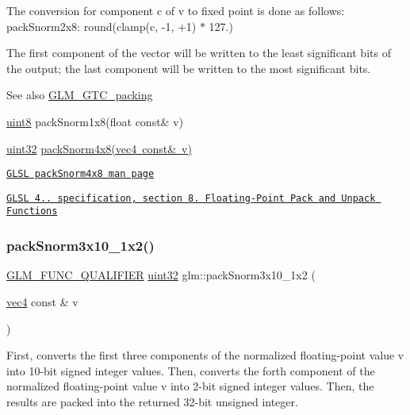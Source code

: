 The conversion for component c of v to fixed point is done as follows\+: pack\+Snorm2x8\+: round(clamp(c, -\/1, +1) $\ast$ 127.)

The first component of the vector will be written to the least significant bits of the output; the last component will be written to the most significant bits.

\begin{DoxySeeAlso}{See also}
\mbox{\hyperlink{group__gtc__packing}{G\+L\+M\+\_\+\+G\+T\+C\+\_\+packing}} 

\mbox{\hyperlink{group__gtc__type__precision_ga1a7dcd8aac97cc8020817c94049deff2}{uint8}} pack\+Snorm1x8(float const\& v) 

\mbox{\hyperlink{group__gtc__type__precision_ga202b6a53c105fcb7e531f9b443518451}{uint32}} \mbox{\hyperlink{group__core__func__packing_ga85e8f17627516445026ab7a9c2e3531a}{pack\+Snorm4x8(vec4 const\& v)}} 

\href{http://www.opengl.org/sdk/docs/manglsl/xhtml/packSnorm4x8.xml}{\tt G\+L\+SL pack\+Snorm4x8 man page} 

\href{http://www.opengl.org/registry/doc/GLSLangSpec.4.20.8.pdf}{\tt G\+L\+SL 4.. specification, section 8. Floating-\/\+Point Pack and Unpack Functions} 
\end{DoxySeeAlso}
\mbox{\label{group__gtc__packing_ga0d4157cec37c0312216a7be1cc92df54}} 
\subsubsection{\texorpdfstring{pack\+Snorm3x10\+\_\+1x2()}{packSnorm3x10\_1x2()}}
{\footnotesize\ttfamily \mbox{\hyperlink{setup_8hpp_a33fdea6f91c5f834105f7415e2a64407}{G\+L\+M\+\_\+\+F\+U\+N\+C\+\_\+\+Q\+U\+A\+L\+I\+F\+I\+ER}} \mbox{\hyperlink{group__gtc__type__precision_ga202b6a53c105fcb7e531f9b443518451}{uint32}} glm\+::pack\+Snorm3x10\+\_\+1x2 (\begin{DoxyParamCaption}\item[{\mbox{\hyperlink{group__core__types_ga5881b1b022d7fd1b7218f5916532dd02}{vec4}} const \&}]{v }\end{DoxyParamCaption})}

First, converts the first three components of the normalized floating-\/point value v into 10-\/bit signed integer values. Then, converts the forth component of the normalized floating-\/point value v into 2-\/bit signed integer values. Then, the results are packed into the returned 32-\/bit unsigned integer.


